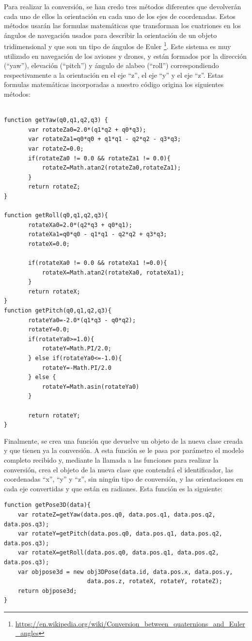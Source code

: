 Para realizar la conversión, se han credo tres métodos diferentes que devolverán cada uno de ellos la orientación en cada uno de los ejes de coordenadas. Estos métodos usarán las formulas matemáticas que transforman los cuatriones en los ángulos de navegación usados para describir la orientación de un objeto tridimensional y que son un tipo de ángulos de Euler \footnote{\url{https://en.wikipedia.org/wiki/Conversion_between_quaternions_and_Euler_angles}}. Este sistema es muy utilizado en navegación de los aviones y drones, y están formados por la dirección (``yaw''), elevación (``pitch'') y ángulo de alabeo (``roll'') correspondiendo respectivamente a la orientación en el eje ``z'', el eje ``y'' y el eje ``z''. Estas formulas matemáticas incorporadas a nuestro código origina los siguientes métodos:

\begin{lstlisting}[frame=single]

function getYaw(q0,q1,q2,q3) {
       var rotateZa0=2.0*(q1*q2 + q0*q3);
       var rotateZa1=q0*q0 + q1*q1 - q2*q2 - q3*q3;
       var rotateZ=0.0;
       if(rotateZa0 != 0.0 && rotateZa1 != 0.0){
           rotateZ=Math.atan2(rotateZa0,rotateZa1);
       }
       return rotateZ;
}

function getRoll(q0,q1,q2,q3){
       rotateXa0=2.0*(q2*q3 + q0*q1);
       rotateXa1=q0*q0 - q1*q1 - q2*q2 + q3*q3;
       rotateX=0.0;

       if(rotateXa0 != 0.0 && rotateXa1 !=0.0){
           rotateX=Math.atan2(rotateXa0, rotateXa1);
       }
       return rotateX;
}
function getPitch(q0,q1,q2,q3){
       rotateYa0=-2.0*(q1*q3 - q0*q2);
       rotateY=0.0;
       if(rotateYa0>=1.0){
           rotateY=Math.PI/2.0;
       } else if(rotateYa0<=-1.0){
           rotateY=-Math.PI/2.0
       } else {
           rotateY=Math.asin(rotateYa0)
       }

       return rotateY;
}
\end{lstlisting}

Finalmente, se crea una función que devuelve un objeto de la nueva clase creada y que tienen ya la conversión. A esta función se le pasa por parámetro el modelo completo recibido y, mediante la llamada a las funciones para realizar la conversión, crea el objeto de la nueva clase que contendrá el identificador, las coordenadas ``x'', ``y'' y ``z'', sin ningún tipo de conversión, y las orientaciones en cada eje convertidas y que están en radianes. Esta función es la siguiente:

\begin{lstlisting}[frame=single]
function getPose3D(data){
	var rotateZ=getYaw(data.pos.q0, data.pos.q1, data.pos.q2, data.pos.q3);
	var rotateY=getPitch(data.pos.q0, data.pos.q1, data.pos.q2, data.pos.q3);
	var rotateX=getRoll(data.pos.q0, data.pos.q1, data.pos.q2, data.pos.q3);
	var objpose3d = new obj3DPose(data.id, data.pos.x, data.pos.y,
						data.pos.z, rotateX, rotateY, rotateZ);
	return objpose3d;
}
\end{lstlisting}

